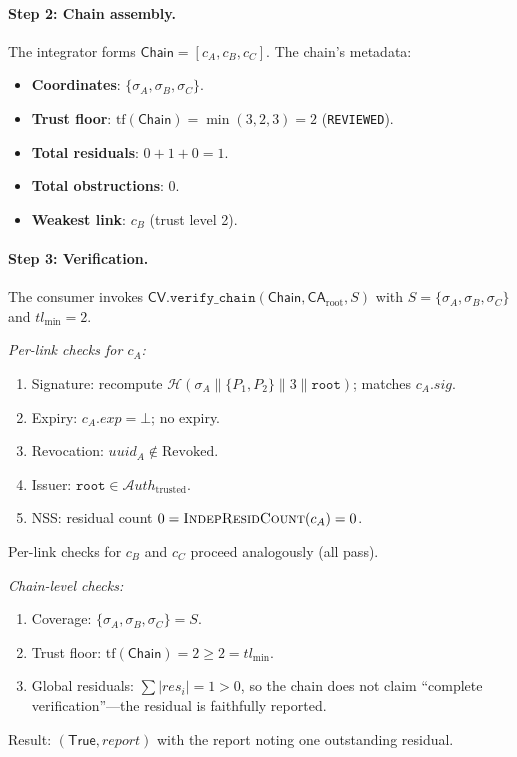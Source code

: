 \documentclass[11pt]{article}
\newcommand{\Chain}{\mathsf{Chain}}            %
\newcommand{\CA}{\mathsf{CA}}                  %
\newcommand{\CV}{\mathsf{CV}}                  %
\newcommand{\certtrust}{\mathit{tl}}           %
\newcommand{\certsig}{\mathit{sig}}            %
\newcommand{\certresid}{\mathit{res}}          %
\newcommand{\certexpiry}{\mathit{exp}}         %
\newcommand{\Revoked}{\mathrm{Revoked}}        %
\newcommand{\Sigalg}{\mathcal{H}}              %
\newcommand{\AuthSet}{\mathcal{A}\!\mathit{uth}} %
\begin{document}
\paragraph{Step 2: Chain assembly.}
The integrator forms $\Chain = [c_A, c_B, c_C]$.
The chain's metadata:
\begin{itemize}
  \item \textbf{Coordinates}: $\{\sigma_A, \sigma_B, \sigma_C\}$.
  \item \textbf{Trust floor}: $\mathrm{tf}(\Chain) = \min(3, 2, 3) = 2$ (\texttt{REVIEWED}).
  \item \textbf{Total residuals}: $0 + 1 + 0 = 1$.
  \item \textbf{Total obstructions}: $0$.
  \item \textbf{Weakest link}: $c_B$ (trust level 2).
\end{itemize}

\paragraph{Step 3: Verification.}
The consumer invokes $\CV.\texttt{verify\_chain}(\Chain, \CA_{\mathrm{root}}, S)$
with $S = \{\sigma_A, \sigma_B, \sigma_C\}$ and $\certtrust_{\min} = 2$.

\medskip\noindent
\emph{Per-link checks for $c_A$:}
\begin{enumerate}[label=(\roman*)]
  \item Signature: recompute $\Sigalg(\sigma_A \| \{P_1,P_2\} \| 3 \| \texttt{root})$;
        matches $c_A.\certsig$. \checkmark
  \item Expiry: $c_A.\certexpiry = \bot$; no expiry. \checkmark
  \item Revocation: $\mathit{uuid}_A \notin \Revoked$. \checkmark
  \item Issuer: $\texttt{root} \in \AuthSet_{\mathrm{trusted}}$. \checkmark
  \item NSS: residual count $0 = \textsc{IndepResidCount}(c_A) = 0$. \checkmark
\end{enumerate}
Per-link checks for $c_B$ and $c_C$ proceed analogously (all pass).

\medskip\noindent
\emph{Chain-level checks:}
\begin{enumerate}[label=(\roman*)]
  \item Coverage: $\{\sigma_A, \sigma_B, \sigma_C\} = S$. \checkmark
  \item Trust floor: $\mathrm{tf}(\Chain) = 2 \ge 2 = \certtrust_{\min}$. \checkmark
  \item Global residuals: $\sum |\certresid_i| = 1 > 0$, so the chain
        does not claim ``complete verification''---the residual is faithfully reported.
\end{enumerate}
Result: $(\mathsf{True}, \mathit{report})$ with the report noting one outstanding residual.
\end{document}
